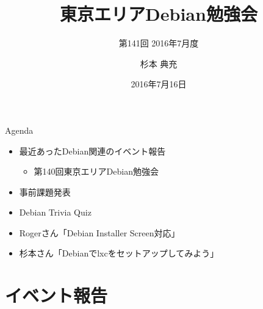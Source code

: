 \title{東京エリアDebian勉強会}
\subtitle{第141回 2016年7月度}
\author{杉本 典充}
\date{2016年7月16日}



\begin{frame}
\titlepage{}
\end{frame}

\begin{frame}{Agenda}
 \begin{minipage}[t]{0.45\hsize}
  \begin{itemize}
  \item 最近あったDebian関連のイベント報告
	\begin{itemize}
	\item 第140回東京エリアDebian勉強会
	\end{itemize}
  \item 事前課題発表
  \end{itemize}
 \end{minipage}
 \begin{minipage}[t]{0.45\hsize}
  \begin{itemize}
   \item Debian Trivia Quiz
   \item Rogerさん「Debian Installer Screen対応」
   \item 杉本さん「Debianでlxcをセットアップしてみよう」
  \end{itemize}
 \end{minipage}
\end{frame}

\section{イベント報告}

